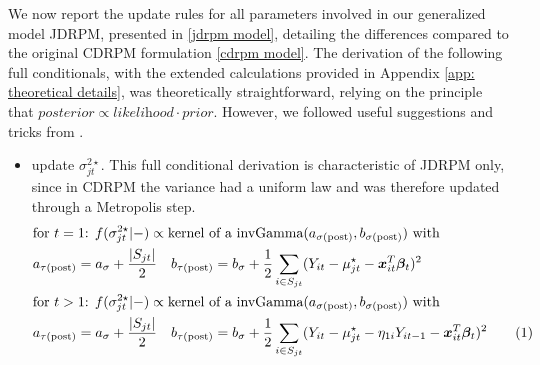 \documentclass[12pt,	%
	a4paper,		%
	twoside,		%
	openright,		%
	titlepage,%
	]{book}
\newcommand\numberthis{\addtocounter{equation}{1}\tag{\theequation}}
\theoremstyle{definition}
\let\cite\citep
\begin{document}
We now report the update rules for all parameters involved in our generalized model JDRPM, presented in \eqref{jdrpm model}, detailing the differences compared to the original CDRPM formulation \eqref{cdrpm model}. The derivation of the following full conditionals, with the extended calculations provided in Appendix \ref{app: theoretical details}, was theoretically straightforward, relying on the principle that $\textit{posterior} \propto \textit{likelihood} \cdot \textit{prior}$. However, we followed useful suggestions and tricks from \cite{full-conditional-derivation}. 


\begin{itemize}

\item update $\sigma^{2\star}_{jt}$. This full conditional derivation is characteristic of JDRPM only, since in CDRPM the variance had a uniform law and was therefore updated through a Metropolis step. 
\begin{align*}
&\text{for $t=1$} \text{: }
  f(\sigma^{2\star}_{jt}|-)\propto \text{kernel of a $\invgamma(a_{\postp{\sigma}}, b_{\postp{\sigma}})$ with}\\
&a_{\postp{\tau}}= a_\sigma + \frac{|S_{jt}|}{2} \quad
%
b_{\postp{\tau}}=b_\sigma + \frac{1}{2}\sum_{i \in S_{jt}}(Y_{it}-\mu^\star_{jt}-\vec{x}_{it}^T\vec{\beta}_t)^2 \\
&\text{for $t>1$}\text{: }
  f(\sigma^{2\star}_{jt}|-) \propto \text{kernel of a $\invgamma(a_{\postp{\sigma}}, b_{\postp{\sigma}})$ with}\\
&a_{\postp{\tau}}= a_\sigma + \frac{|S_{jt}|}{2} \quad
%
b_{\postp{\tau}}=b_\sigma + \frac{1}{2}\sum_{i \in S_{jt}}(Y_{it}-\mu^\star_{jt}-\eta_{1i}Y_{it-1}-\vec{x}_{it}^T\vec{\beta}_t)^2 
 \numberthis \label{update sigma2h}
\end{align*}



\end{itemize}
\end{document}
